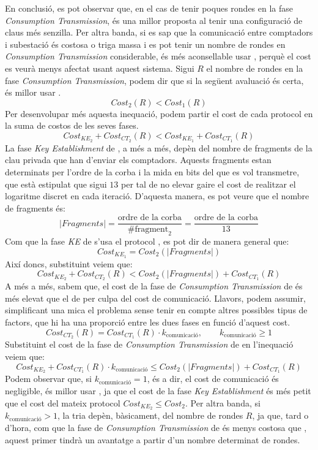 En conclusió, es pot observar que, en el cas de tenir poques rondes en la fase \textit{Consumption Transmission}, \cite{busom} és una millor proposta al tenir una configuració de claus més senzilla. 
Per altra banda, si es sap que la comunicació entre comptadors i subestació és costosa o triga massa  i es pot tenir un nombre de rondes en \textit{Consumption Transmission} considerable, és més aconsellable usar \cite{recsi}, perquè el cost es veurà menys afectat usant aquest sistema. Sigui $R$ el nombre de rondes en la fase \textit{Consumption Transmission}, podem dir que si la següent avaluació és certa, és millor usar \cite{busom}.
\[Cost_2(R) < Cost_1(R)\]
Per desenvolupar més aquesta inequació, podem partir el cost de cada protocol en la suma de costos de les seves fases.
\[Cost_{KE_2} + Cost_{CT_2}(R) <  Cost_{KE_1} + Cost_{CT_1}(R)\]
La fase \textit{Key Establishment} de \cite{recsi}, a més a més, depèn del nombre de fragments de la clau privada que han d'enviar els comptadors. Aquests fragments estan determinats per l'ordre de la corba i la mida en bits del que es vol transmetre, que està estipulat que sigui $13$ per tal de no elevar gaire el cost de realitzar el logaritme discret en cada iteració. D'aquesta manera, es pot veure que el nombre de fragments és: 
\[|Fragments| = \frac{\textrm{ordre de la corba}}{\#\textrm{fragment}_2} = \frac{\textrm{ordre de la corba}}{13}\]
Com que la fase \textit{KE} de \cite{recsi} s'usa el protocol \cite{busom}, es pot dir de manera general que:
\[Cost_{KE_1} = Cost_2(|Fragments|)\]
Així doncs, substituint veiem que:
\[Cost_{KE_2} + Cost_{CT_2}(R) <  Cost_{2}(|Fragments|) + Cost_{CT_1}(R)\]
A més a més, sabem que, el cost de la fase de \textit{Consumption Transmission} de \cite{busom} és més elevat que el de \cite{recsi} per culpa del cost de comunicació. Llavors, podem assumir, simplificant una mica el problema sense tenir en compte altres possibles tipus de factors, que hi ha una proporció entre les dues fases en funció d'aquest cost.
\[Cost_{CT_2}(R) = Cost_{CT_1}(R) \cdot k_{\textrm{comunicació}}, \qquad k_{\textrm{comunicació}} \ge 1\]
Substituint el cost de la fase de \textit{Consumption Transmission} de \cite{busom} en l'inequació veiem que:
\[Cost_{KE_2} + Cost_{CT_1}(R) \cdot k_{\textrm{comunicació}} \le  Cost_{2}(|Fragments|) + Cost_{CT_1}(R)\]
Podem observar que, si $k_{\textrm{comunicació}} = 1$, és  a dir, el cost de comunicació és negligible, és millor usar \cite{busom}, ja que el cost de la fase \textit{Key Establishment} és més petit que el cost del mateix protocol $Cost_{KE_2} \le Cost_{2}$. Per altra banda, si $k_{\textrm{comunicació}} > 1$, la tria depèn, bàsicament, del nombre de rondes $R$, ja que, tard o d'hora, com que la fase de \textit{Consumption Transmission} de \cite{recsi} és menys costosa que \cite{busom}, aquest primer tindrà un avantatge a partir d'un nombre determinat de rondes.
